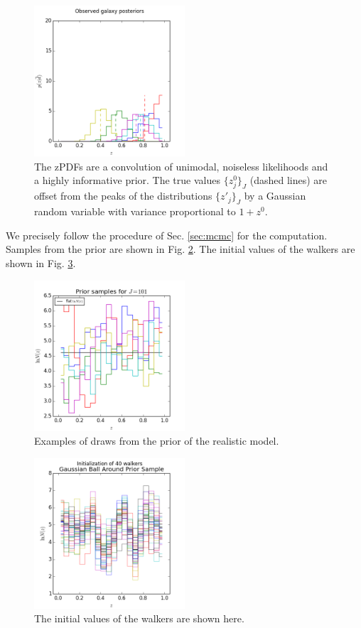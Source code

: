 \documentclass[preprint]{aastex}
\begin{document}
\begin{figure}
\includegraphics[width=0.5\textwidth]{null/samplepzs.png}
\caption{The zPDFs are a convolution of unimodal, noiseless likelihoods and a 
highly informative prior.  The true values $\{z^{0}_{j}\}_{J}$ (dashed lines) 
are offset from the peaks of the distributions $\{z'_{j}\}_{J}$ by a Gaussian 
random variable with variance proportional to $1+z^{0}$.}
\label{fig:nullpzs}
\end{figure}

We precisely follow the procedure of Sec. \ref{sec:mcmc} for the computation.  
Samples from the prior are shown in Fig. \ref{fig:nullprior}.  The initial 
values of the walkers are shown in Fig. \ref{fig:nullival}.

\begin{figure}
\includegraphics[width=0.5\textwidth]{null/priorsamps.png}
\caption{Examples of draws from the prior of the realistic model.}
\label{fig:nullprior}
\end{figure}

\begin{figure}
\includegraphics[width=0.5\textwidth]{null/initializations.png}
\caption{The initial values of the walkers are shown here.}
\label{fig:nullival}
\end{figure}
\end{document}
